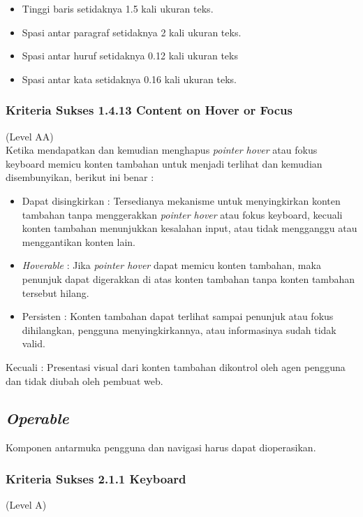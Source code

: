 \documentclass[a4paper,twoside]{article}
\begin{document}
\begin{enumerate}
		\begin{itemize}
			\item Tinggi baris setidaknya 1.5 kali ukuran teks.
			\item Spasi antar paragraf setidaknya 2 kali ukuran teks.
			\item Spasi antar huruf setidaknya 0.12 kali ukuran teks
			\item Spasi antar kata setidaknya 0.16 kali ukuran teks.
		\end{itemize}
		
		\subsubsection*{Kriteria Sukses 1.4.13 Content on Hover or Focus}
		\label{subsubsec:kriteria_1.4.13}
		(Level AA) \\
		
		Ketika mendapatkan dan kemudian menghapus \textit{pointer hover} atau fokus keyboard memicu konten tambahan untuk menjadi terlihat dan kemudian disembunyikan, berikut ini benar :
		
		\begin{itemize}
			\item Dapat disingkirkan : Tersedianya mekanisme untuk menyingkirkan konten tambahan tanpa menggerakkan \textit{pointer hover} atau fokus keyboard, kecuali konten tambahan menunjukkan kesalahan input, atau tidak mengganggu atau menggantikan konten lain.
			\item \textit{Hoverable} : Jika \textit{pointer hover} dapat memicu konten tambahan, maka penunjuk dapat digerakkan di atas konten tambahan tanpa konten tambahan tersebut hilang.
			\item Persisten : Konten tambahan dapat terlihat sampai penunjuk atau fokus dihilangkan, pengguna menyingkirkannya, atau informasinya sudah tidak valid.
		\end{itemize}
		
		Kecuali : Presentasi visual dari konten tambahan dikontrol oleh agen pengguna dan tidak diubah oleh pembuat web.
		
		\subsection*{\textit{Operable}}
		\label{subsec:operable}
		Komponen antarmuka pengguna dan navigasi harus dapat dioperasikan.
		
		\subsubsection*{Kriteria Sukses 2.1.1 Keyboard}
		\label{subsubsec:kriteria_2.1.1}
		(Level A) \\
		

\end{enumerate}
\end{document}
